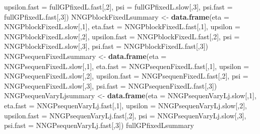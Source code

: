 \documentclass[
]{article}
\newenvironment{Shaded}{\begin{snugshade}}{\end{snugshade}}
\newcommand{\AttributeTok}[1]{\textcolor[rgb]{0.13,0.29,0.53}{#1}}
\newcommand{\DecValTok}[1]{\textcolor[rgb]{0.00,0.00,0.81}{#1}}
\newcommand{\FunctionTok}[1]{\textcolor[rgb]{0.13,0.29,0.53}{\textbf{#1}}}
\newcommand{\NormalTok}[1]{#1}
\newcommand{\OtherTok}[1]{\textcolor[rgb]{0.56,0.35,0.01}{#1}}
\begin{document}
\begin{Shaded}
\begin{Highlighting}[]
                                  \AttributeTok{upsilon.fast =}\NormalTok{ fullGPfixedL.fast[,}\DecValTok{2}\NormalTok{],}
                                  \AttributeTok{psi =}\NormalTok{ fullGPfixedL.slow[,}\DecValTok{3}\NormalTok{], }
                                  \AttributeTok{psi.fast =}\NormalTok{ fullGPfixedL.fast[,}\DecValTok{3}\NormalTok{])}
\NormalTok{NNGPblockFixedLsummary }\OtherTok{\textless{}{-}} \FunctionTok{data.frame}\NormalTok{(}\AttributeTok{eta =}\NormalTok{ NNGPblockFixedL.slow[,}\DecValTok{1}\NormalTok{], }
                                     \AttributeTok{eta.fast =}\NormalTok{ NNGPblockFixedL.fast[,}\DecValTok{1}\NormalTok{],}
                                     \AttributeTok{upsilon =}\NormalTok{ NNGPblockFixedL.slow[,}\DecValTok{2}\NormalTok{], }
                                     \AttributeTok{upsilon.fast =}\NormalTok{ NNGPblockFixedL.fast[,}\DecValTok{2}\NormalTok{],}
                                     \AttributeTok{psi =}\NormalTok{ NNGPblockFixedL.slow[,}\DecValTok{3}\NormalTok{], }
                                     \AttributeTok{psi.fast =}\NormalTok{ NNGPblockFixedL.fast[,}\DecValTok{3}\NormalTok{])}
\NormalTok{NNGPsequenFixedLsummary }\OtherTok{\textless{}{-}} \FunctionTok{data.frame}\NormalTok{(}\AttributeTok{eta =}\NormalTok{ NNGPsequenFixedL.slow[,}\DecValTok{1}\NormalTok{], }
                                      \AttributeTok{eta.fast =}\NormalTok{ NNGPsequenFixedL.fast[,}\DecValTok{1}\NormalTok{],}
                                      \AttributeTok{upsilon =}\NormalTok{ NNGPsequenFixedL.slow[,}\DecValTok{2}\NormalTok{], }
                                      \AttributeTok{upsilon.fast =}\NormalTok{ NNGPsequenFixedL.fast[,}\DecValTok{2}\NormalTok{],}
                                      \AttributeTok{psi =}\NormalTok{ NNGPsequenFixedL.slow[,}\DecValTok{3}\NormalTok{], }
                                      \AttributeTok{psi.fast =}\NormalTok{ NNGPsequenFixedL.fast[,}\DecValTok{3}\NormalTok{])}
\NormalTok{NNGPsequenVaryLjsummary }\OtherTok{\textless{}{-}} \FunctionTok{data.frame}\NormalTok{(}\AttributeTok{eta =}\NormalTok{ NNGPsequenVaryLj.slow[,}\DecValTok{1}\NormalTok{], }
                                      \AttributeTok{eta.fast =}\NormalTok{ NNGPsequenVaryLj.fast[,}\DecValTok{1}\NormalTok{],}
                                      \AttributeTok{upsilon =}\NormalTok{ NNGPsequenVaryLj.slow[,}\DecValTok{2}\NormalTok{], }
                                      \AttributeTok{upsilon.fast =}\NormalTok{ NNGPsequenVaryLj.fast[,}\DecValTok{2}\NormalTok{],}
                                      \AttributeTok{psi =}\NormalTok{ NNGPsequenVaryLj.slow[,}\DecValTok{3}\NormalTok{], }
                                      \AttributeTok{psi.fast =}\NormalTok{ NNGPsequenVaryLj.fast[,}\DecValTok{3}\NormalTok{])}
\NormalTok{fullGPfixedLsummary}
\end{Highlighting}
\end{Shaded}
\end{document}
